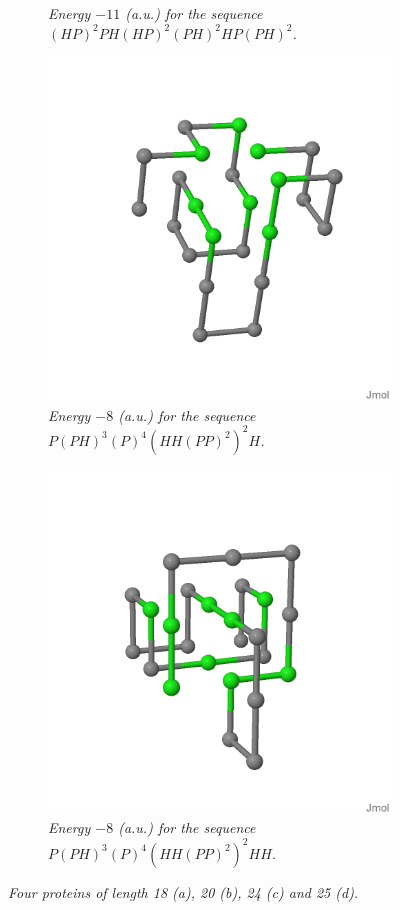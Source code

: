 \begin{figure}[H]
\begin{subfigure}[b]{0.45\textwidth}
        \caption{\emph{Energy $-11$ (a.u.) for the sequence $(HP)^2PH(HP)^2(PH)^2HP(PH)^2$.}}
    \end{subfigure}
    \begin{subfigure}[b]{0.45\textwidth}
        \centering
        \includegraphics[width=\textwidth]{./img/24_3D.png}
        \caption{\emph{Energy $-8$ (a.u.) for the sequence $P(PH)^3(P)^4(HH(PP)^2)^2H$.}}
    \end{subfigure}
    \begin{subfigure}[b]{0.45\textwidth}
        \centering
        \includegraphics[width=\textwidth]{./img/25_3D.png}
        \caption{\emph{Energy $-8$ (a.u.) for the sequence $P(PH)^3(P)^4(HH(PP)^2)^2HH$.}}
    \end{subfigure}

    \caption{\emph{Four proteins of length 18 (a), 20 (b), 24 (c) and 25 (d).}}
    \label{fig:cpsp}
\end{figure}

